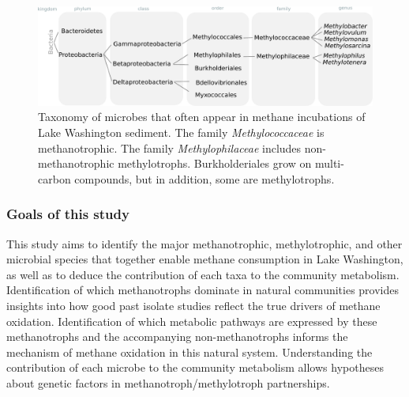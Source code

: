 \begin{figure}[H]
\centering
    \includegraphics[width=1.0\textwidth]{./tex/chapter2/figures/170311_taxonomy_overview.pdf}
    \begin{singlespace}
    \caption[Taxonomy of microbes known to factor into methane oxidation in Lake Washington sediment]{
       Taxonomy of microbes that often appear in methane incubations of Lake Washington sediment.
       The family \textit{Methylococcaceae} is methanotrophic.
       The family \textit{Methylophilaceae} includes non-methanotrophic methylotrophs.
       Burkholderiales grow on multi-carbon compounds, but in addition, some are methylotrophs.}
    \label{fig:taxonomy}
    \end{singlespace}
\end{figure}

\subsubsection{Goals of this study}
This study aims to identify the major methanotrophic, methylotrophic, and other microbial species that together enable methane consumption in Lake Washington, as well as to deduce the contribution of each taxa to the community metabolism.
Identification of which methanotrophs dominate in natural communities provides insights into how good past isolate studies reflect the true drivers of methane oxidation.
Identification of which metabolic pathways are expressed by these methanotrophs and the accompanying non-methanotrophs informs the mechanism of methane oxidation in this natural system.
Understanding the contribution of each microbe to the community metabolism allows hypotheses about genetic factors in methanotroph/methylotroph partnerships.


